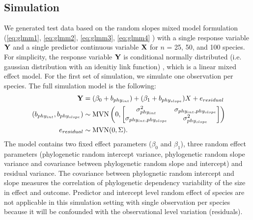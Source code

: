 \documentclass[12pt]{article}
\begin{document}
\subsection{Simulation}

We generated test data based on the random slopes mixed model formulation (\ref{eq:glmm1}, \ref{eq:glmm2}, \ref{eq:glmm3}, \ref{eq:glmm4} ) with a single response variable ${\mathbf Y}$ and a single predictor continuous variable ${\mathbf X}$ for $n$ = 25, 50, and 100 species.
For simplicity, the response variable ${\mathbf Y}$ is conditional normally distributed (i.e. gaussian distribution with an idenitiy link function) , which is a linear mixed effect model. 
For the first set of simulation, we simulate one observation per species.
The full simulation model is the following:
\begin{align}
{\mathbf Y} & = (\beta_0 + b_{phy_{int}}) + (\beta_1 + b_{phy_{slope}}) X + e_{residual}  \label{eq:ss_sim}\\\
(b_{phy_{int}}, b_{phy_{slope}}) & \sim \textrm{MVN} \left( 0, \begin{bmatrix}
\sigma^2_{phy_{int}} & \sigma_{phy_{int},phy_{slope}} \\ 
\sigma_{phy_{int},phy_{slope}} & \sigma^2_{phy_{slope}}
\end{bmatrix} 
\right) \\ 
e_{residual} & \sim \textrm{MVN} ( 0 , \Sigma) .
\end{align}
The model contains two fixed effect parameters ($\beta_0$ and $\beta_1$), three random effect parameters (phylogenetic random intercept variance, phylogenetic random slope variance and covariance between phylogenetic random slope and intercept) and residual variance.  
The covariance between phylognetic random intercept and slope measures the correlation of phylogenetic dependency variability of the size in effect and outcome.
\mli{con't here!}
Predictor and intercept level random effect of species are not applicable in this simulation setting with single observation per species because it will be confounded with the observational level variation (residuals).
\end{document}
